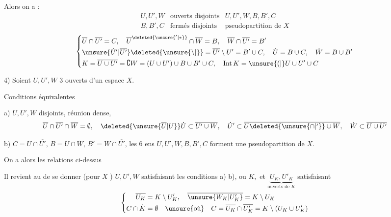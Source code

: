 Alors on a :
\[
\begin{array}{ll|l}
 U,U',W&\text{ouverts disjoints}& U,U',W,B,B',C\\
 B,B',C&\text{fermés disjoints}&\text{pseudopartition de }X
\end{array}
\]
\[
\left\{\begin{aligned}
 &\overline U\cap\overline{U'}=C,\quad
 \overline U^{\deleted{\unsure{'|*}}}\cap\overline W=B,\quad
 \overline W\cap\overline{U'}=B'\\
 &\unsure{\dot U'|\overline{U'}}\deleted{\unsure{\setminus|{}}}=\overline{U'}\setminus U'=B'\cup C,\quad
 \dot U=B\cup C,\quad \dot W=B\cup B'\\
 &K=\overline{U\cup U'}=\complement W=(U\cup U')\cup B\cup B'\cup C,\quad
 \mathrm{Int}\,K=\unsure{(|{}}U\cup U'\cup C
\end{aligned}\right.
\]

4)  Soient $U,U',W$ 3 ouverts d'un espace $X$.

Conditions équivalentes

a) $U,U',W$  disjoints, réunion dense,
\[
 \overline U\cap\overline{U'}\cap\overline W=\emptyset,\quad
 \deleted{\unsure{\overline U|U}}\dot U\subset\overline{U'\cup W},\quad
 \dot U'\subset\overline{U\deleted{\unsure{\cap|'}}\cup W},\quad
 \dot W\subset\overline{U\cup U'}
\]

b)  $C=\overline U\cap\overline{U'}$, $B=\overline U\cap\overline W$, $B'=\overline W\cap\overline{U'}$, les 6 ens $U,U',W,B,B',C$ forment une pseudopartition de $X$.

On a alors les relations ci-dessus \unsure{--|$\cdots$}

Il revient au \unsure{$=$} de se donner (pour $X$ ) $U,U',W$ satisfaisant les conditions  a) b), ou $K,$  et $\underbrace{U_K,U'_K}_{\text{ouverts de }K}$ satisfaisant
\[
\left\{\begin{aligned}
 \overline{U_K}&=K\setminus U'_K,\quad \overline{\unsure{W_K|U'_K}}=K\setminus U_K\\
 C\cap\dot K&=\emptyset\quad \text{\unsure{où}}\quad C=\overline{U_K}\cap\overline{U'_K}=K\setminus(U_K\cup U'_K)
\end{aligned}\right.
\]

